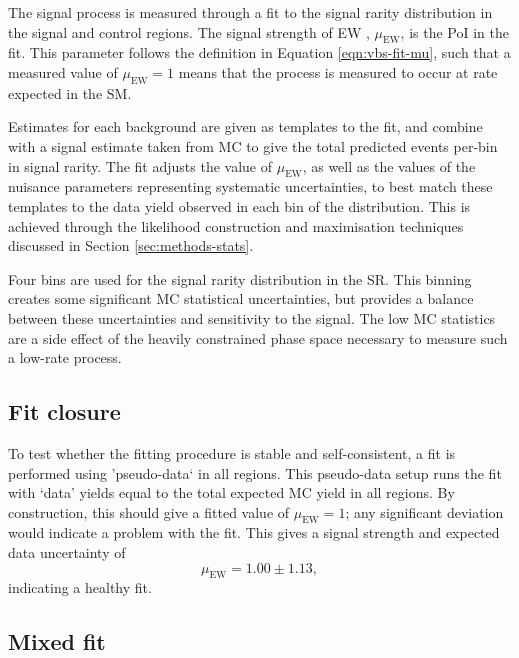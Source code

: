 
\newcommand\muEW{\ensuremath{\mu_{\text{EW}}}\xspace}
The signal process is measured through a fit to the signal rarity distribution
in the signal and control regions. The signal strength of \ac{EW} \VZy,
\muEW, is the \ac{PoI} in the fit. This parameter follows the
definition in Equation \ref{eqn:vbs-fit-mu}, such that a measured value of
$\muEW = 1$ means that the process is measured to occur at rate expected in the
\ac{SM}.

Estimates for each background are given as templates to the fit, and combine
with a signal estimate taken from \ac{MC} to give the total predicted events
per-bin in signal rarity. The fit adjusts the value of \muEW, as well as the
values of the nuisance parameters representing systematic uncertainties, to best
match these templates to the data yield observed in each bin of the
distribution. This is achieved through the likelihood construction and
maximisation techniques discussed in Section \ref{sec:methods-stats}.

Four bins are used for the signal rarity distribution in the \ac{SR}. This
binning creates some significant \ac{MC} statistical uncertainties, but provides
a balance between these uncertainties and sensitivity to the signal. The low
\ac{MC} statistics are a side effect of the heavily constrained phase space
necessary to measure such a low-rate process.

\subsection{Fit closure}

To test whether the fitting procedure is stable and self-consistent, a fit is
performed using 'pseudo-data` in all regions. This pseudo-data setup runs the
fit with `data' yields equal to the total expected \ac{MC} yield in all regions.
By construction, this should give a fitted value of $\muEW = 1$; any significant
deviation would indicate a problem with the fit. This gives a signal strength
and expected data uncertainty of
%
\begin{equation*}
  \muEW = 1.00 \pm 1.13,
\end{equation*}
%
indicating a healthy fit.

\subsection{Mixed fit}
\label{sec:vzy-fit-mixed}

